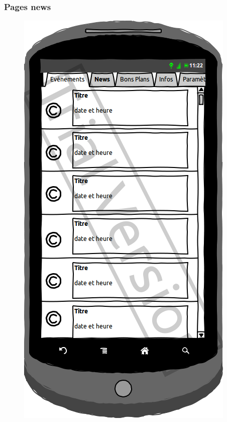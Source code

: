 \documentclass[a4paper, 11px]{article}
\begin{document}
\subsubsection{Pages news}
\vfill
\begin{figure}[htbp]
	\begin{minipage}[c]{.50\linewidth}
		\begin{center}
			\includegraphics[scale=0.3]{../../Sketch/Android/News.png}
		\end{center}
	\end{minipage}
	\hfill
	\begin{minipage}[c]{.50\linewidth}
		\begin{center}

\end{center}
\end{minipage}
\end{figure}
\end{document}
